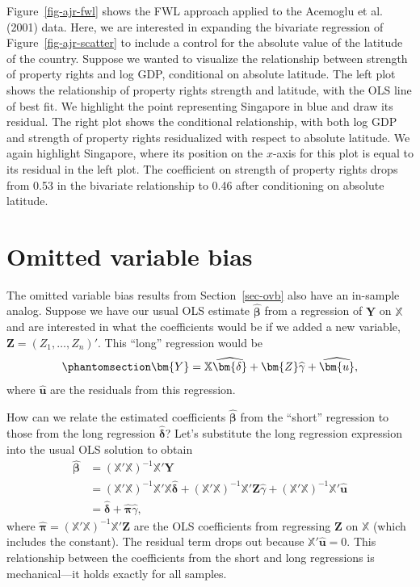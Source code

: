 \documentclass[
  13pt,
  letterpaper,
  DIV=11,
  numbers=noendperiod]{scrreprt}
\newcommand{\bs}{\bm}
\newcommand{\mb}{\bm}
\newcommand{\Xmat}{\mathbb{X}}
\newcommand{\bhat}{\widehat{\mb{\beta}}}
\theoremstyle{plain}
\theoremstyle{plain}
\theoremstyle{definition}
\theoremstyle{definition}
\theoremstyle{remark}
\begin{document}
Figure~\ref{fig-ajr-fwl} shows the FWL approach applied to the Acemoglu
et al. (2001) data. Here, we are interested in expanding the bivariate
regression of Figure~\ref{fig-ajr-scatter} to include a control for the
absolute value of the latitude of the country. Suppose we wanted to
visualize the relationship between strength of property rights and log
GDP, conditional on absolute latitude. The left plot shows the
relationship of property rights strength and latitude, with the OLS line
of best fit. We highlight the point representing Singapore in blue and
draw its residual. The right plot shows the conditional relationship,
with both log GDP and strength of property rights residualized with
respect to absolute latitude. We again highlight Singapore, where its
position on the \(x\)-axis for this plot is equal to its residual in the
left plot. The coefficient on strength of property rights drops from
0.53 in the bivariate relationship to 0.46 after conditioning on
absolute latitude.

\section{Omitted variable bias}\label{sec-ovb-in-sample}

The omitted variable bias results from Section~\ref{sec-ovb} also have
an in-sample analog. Suppose we have our usual OLS estimate \(\bhat\)
from a regression of \(\mb{Y}\) on \(\Xmat\) and are interested in what
the coefficients would be if we added a new variable,
\(\mb{Z} = (Z_1, \ldots, Z_n)'\). This ``long'' regression would be
\begin{equation}\protect\phantomsection\label{eq-ovb-long}{
\mb{Y} = \Xmat\widehat{\bs{\delta}} + \mb{Z}\widehat{\gamma} + \widehat{\mb{u}},
}\end{equation} where \(\widehat{\mb{u}}\) are the residuals from this
regression.

How can we relate the estimated coefficients \(\bhat\) from the
``short'' regression to those from the long regression
\(\widehat{\bs{\delta}}\)? Let's substitute the long regression
expression into the usual OLS solution to obtain \[
\begin{aligned}
\bhat &= (\Xmat'\Xmat)^{-1}\Xmat'\mb{Y} \\
&= (\Xmat'\Xmat)^{-1}\Xmat'\Xmat\widehat{\bs{\delta}} + (\Xmat'\Xmat)^{-1}\Xmat'\mb{Z}\widehat{\gamma} + (\Xmat'\Xmat)^{-1}\Xmat'\widehat{\mb{u}} \\
&= \widehat{\bs{\delta}} + \widehat{\bs{\pi}}\widehat{\gamma},
\end{aligned}
\] where \(\widehat{\bs{\pi}} = (\Xmat'\Xmat)^{-1}\Xmat'\mb{Z}\) are the
OLS coefficients from regressing \(\mb{Z}\) on \(\Xmat\) (which includes
the constant). The residual term drops out because
\(\Xmat'\widehat{\mb{u}} = 0\). This relationship between the
coefficients from the short and long regressions is mechanical---it
holds exactly for all samples.
\end{document}
